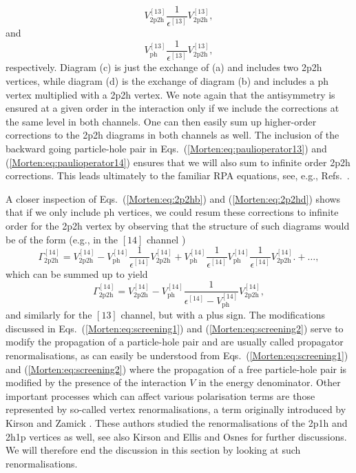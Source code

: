 \begin{equation}
    V_{\mathrm{2p2h}}^{[13]}
     \frac{1}{\epsilon^{[13]}}
     V_{\mathrm{2p2h}}^{[13]},
\end{equation}
and
\begin{equation}
    V_{\mathrm{ph}}^{[13]}
     \frac{1}{\epsilon^{[13]}}
     V_{\mathrm{2p2h}}^{[13]},
\end{equation}
respectively. Diagram (c) is just the exchange of (a)
and includes two 2p2h vertices, while diagram (d) is the exchange
of diagram (b) and includes a ph vertex multiplied with
a 2p2h vertex. We note again that the antisymmetry is
ensured at a given order in the interaction only
if we include the corrections at the same level in both
channels.
One can then easily sum up higher-order corrections 
to the 2p2h diagrams in both channels  as well.
The inclusion of the backward going particle-hole
pair in  Eqs.~(\ref{Morten:eq:paulioperator13})
and (\ref{Morten:eq:paulioperator14}) ensures that we will
also sum to infinite order 2p2h corrections.
This leads ultimately to the familiar RPA equations,
see, e.g., Refs.~.  

A closer inspection of Eqs.~(\ref{Morten:eq:2p2hb}) and
(\ref{Morten:eq:2p2hd}) shows that if we only include ph vertices,
we could resum these corrections to infinite
order for the 2p2h vertex by observing that the 
structure of such diagrams would be of the form
(e.g., in the $[14]$ channel )
\begin{equation}
       \Gamma_{\mathrm{2p2h}}^{[14]}=V^{[14]}_{\mathrm{2p2h}}-
        V^{[14]}_{\mathrm{ph}}
        \frac{1}{\epsilon^{[14]}}
        V_{\mathrm{2p2h}}^{[14]}+
        V^{[14]}_{\mathrm{ph}}
        \frac{1}{\epsilon^{[14]}}
        V^{[14]}_{\mathrm{ph}}
        \frac{1}{\epsilon^{[14]}}
        V^{[14]}_{\mathrm{2p2h}}.
             +\dots,
\end{equation}
which can be summed up to yield 
\begin{equation}
  \Gamma^{[14]}_{\mathrm{2p2h}}=V^{[14]}_{\mathrm{2p2h}}-
   V^{[14]}_{\mathrm{ph}}
   \frac{1}
   {\epsilon^{[14]}-V^{[14]}_{\mathrm{ph}}}
   V^{[14]}_{\mathrm{2p2h}},
   \label{Morten:eq:screening2}
\end{equation}
and similarly for the $[13]$ channel, but with a plus sign.
The modifications discussed in Eqs.~(\ref{Morten:eq:screening1})
and (\ref{Morten:eq:screening2})
serve to modify the propagation of a particle-hole pair
and are usually called propagator
renormalisations, as can easily be understood from 
Eqs.~(\ref{Morten:eq:screening1})
and (\ref{Morten:eq:screening2}) where the propagation of 
a free particle-hole pair is modified by the presence 
of the interaction $V$ in the energy denominator.
Other important processes which can affect 
various polarisation terms are those 
represented by so-called vertex renormalisations,
a term originally introduced by Kirson and Zamick \cite{Morten:kz70}.
These authors studied the renormalisations of the 
2p1h and 2h1p vertices as well, see also Kirson \cite{Morten:kirson74}
and Ellis and Osnes \cite{Morten:eo77} for further discussions.
We will therefore end the discussion in this section
by looking at such renormalisations.

